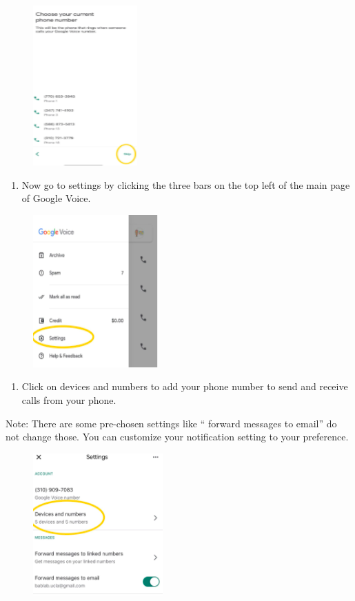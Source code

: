 \documentclass[]{book}
\providecommand{\tightlist}{%
  \setlength{\itemsep}{0pt}\setlength{\parskip}{0pt}}
\begin{document}
\begin{figure}
\centering
\includegraphics{images/research_protocols/google_voice/pic4.png}
\caption{}
\end{figure}

\begin{enumerate}
\def\labelenumi{\arabic{enumi})}
\setcounter{enumi}{4}
\tightlist
\item
  Now go to settings by clicking the three bars on the top left of the main page of Google Voice.
\end{enumerate}

\begin{figure}
\centering
\includegraphics{images/research_protocols/google_voice/pic5.png}
\caption{}
\end{figure}

\begin{enumerate}
\def\labelenumi{\arabic{enumi})}
\setcounter{enumi}{5}
\tightlist
\item
  Click on devices and numbers to add your phone number to send and receive calls from your phone.
\end{enumerate}

Note: There are some pre-chosen settings like `` forward messages to email'' do not change those. You can customize your notification setting to your preference.

\begin{figure}
\centering
\includegraphics{images/research_protocols/google_voice/pic6.png}
\caption{}
\end{figure}
\end{document}
